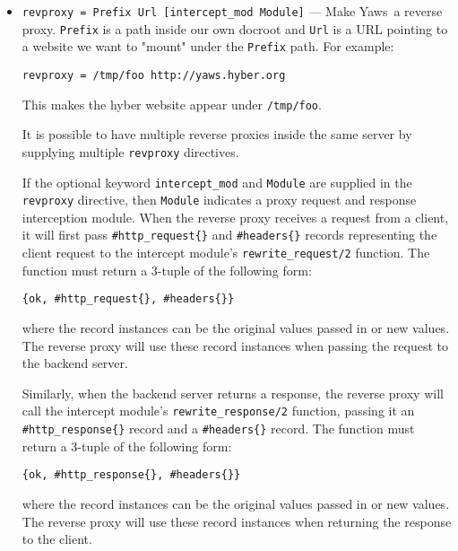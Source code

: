 \documentclass[11pt,oneside,english]{book}
\newcommand{\Yaws}            %
        {{\sc Yaws}}
\begin{document}
\begin{itemize}
\item       \verb+revproxy = Prefix Url [intercept_mod Module]+ ---
              Make \Yaws\ a reverse proxy. \verb+Prefix+ is a path inside our own
              docroot and \verb+Url+ is a URL pointing to a website we
              want to "mount" under the \verb+Prefix+ path. For example:

              \verb+revproxy = /tmp/foo http://yaws.hyber.org+

              This makes the hyber website appear under \verb+/tmp/foo+.

              It is possible to have multiple reverse proxies inside the same
              server by supplying multiple \verb+revproxy+ directives.

              If the optional keyword \verb+intercept_mod+ and
              \verb+Module+ are supplied in the \verb+revproxy+ directive,
              then \verb+Module+ indicates a proxy request and response
              interception module. When the reverse proxy receives a
              request from a client, it will first pass
              \verb+#http_request{}+ and \verb+#headers{}+ records
              representing the client request to the intercept module's
              \verb+rewrite_request/2+ function. The function must return a
              3-tuple of the following form:

\begin{verbatim}
{ok, #http_request{}, #headers{}}
\end{verbatim}

              where the record instances can be the original values passed
              in or new values. The reverse proxy will use these record
              instances when passing the request to the backend server.

              Similarly, when the backend server returns a response, the
              reverse proxy will call the intercept module's
              \verb+rewrite_response/2+ function, passing it an
              \verb+#http_response{}+ record and a \verb+#headers{}+
              record. The function must return a 3-tuple of the following
              form:

\begin{verbatim}
{ok, #http_response{}, #headers{}}
\end{verbatim}

              where the record instances can be the original values passed
              in or new values. The reverse proxy will use these record
              instances when returning the response to the client.


\end{itemize}
\end{document}
